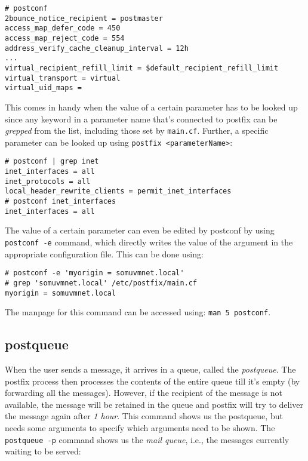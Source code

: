 \vspace{-15pt}
\begin{verbatim}
# postconf
2bounce_notice_recipient = postmaster
access_map_defer_code = 450
access_map_reject_code = 554
address_verify_cache_cleanup_interval = 12h
...
virtual_recipient_refill_limit = $default_recipient_refill_limit
virtual_transport = virtual
virtual_uid_maps =
\end{verbatim}
\vspace{-10pt}	

\noindent
This comes in handy when the value of a certain parameter has to be looked up since any keyword in a parameter name that's connected to postfix can be \textit{grepped} from the list, including those set by \verb|main.cf|. Further, a specific parameter can be looked up using \verb|postfix <parameterName>|:

\vspace{-15pt}
\begin{verbatim}
# postconf | grep inet
inet_interfaces = all
inet_protocols = all
local_header_rewrite_clients = permit_inet_interfaces
# postconf inet_interfaces
inet_interfaces = all
\end{verbatim}
\vspace{-10pt}	

\noindent
The value of a certain parameter can even be edited by postconf by using \verb|postconf -e| command, which directly writes the value of the argument in the appropriate configuration file. This can be done using:

\vspace{-15pt}
\begin{verbatim}
# postconf -e 'myorigin = somuvmnet.local'
# grep 'somuvmnet.local' /etc/postfix/main.cf
myorigin = somuvmnet.local
\end{verbatim}
\vspace{-10pt}	

\noindent
The manpage for this command can be accessed using: \verb|man 5 postconf|.

\subsection{postqueue}
When the user sends a message, it arrives in a queue, called the \textit{postqueue}. The postfix process then processes the contents of the entire queue till it's empty (by forwarding all the messages). However, if the recipient of the message is not available, the message will be retained in the queue and postfix will try to deliver the message again after \textit{1 hour}. This command shows us the postqueue, but needs some arguments to specify which arguments need to be shown. The \verb|postqueue -p| command shows us the \textit{mail queue}, i.e., the messages currently waiting to be served:

